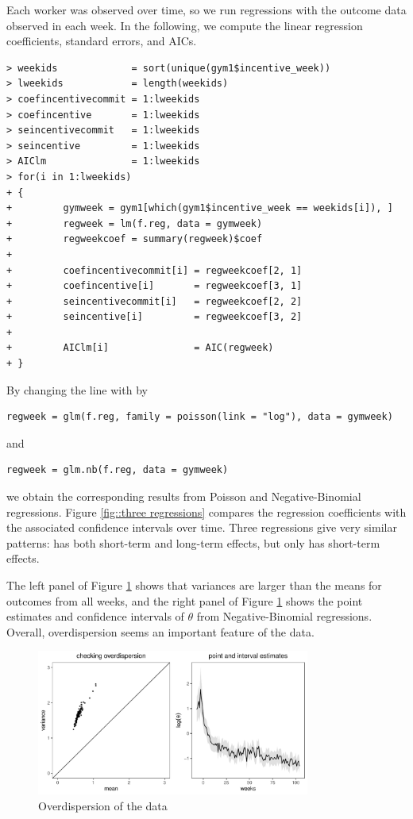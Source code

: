 Each worker was observed over time, so we run regressions with the outcome data observed in each week. In the following, we compute the linear regression coefficients, standard errors, and AICs. 

\begin{lstlisting}
> weekids             = sort(unique(gym1$incentive_week))
> lweekids            = length(weekids)
> coefincentivecommit = 1:lweekids
> coefincentive       = 1:lweekids
> seincentivecommit   = 1:lweekids
> seincentive         = 1:lweekids
> AIClm               = 1:lweekids
> for(i in 1:lweekids)
+ {
+         gymweek = gym1[which(gym1$incentive_week == weekids[i]), ]   
+         regweek = lm(f.reg, data = gymweek)
+         regweekcoef = summary(regweek)$coef
+         
+         coefincentivecommit[i] = regweekcoef[2, 1]
+         coefincentive[i]       = regweekcoef[3, 1]
+         seincentivecommit[i]   = regweekcoef[2, 2]
+         seincentive[i]         = regweekcoef[3, 2]
+         
+         AIClm[i]               = AIC(regweek)
+ }
\end{lstlisting}


By changing the line with  by 
\begin{lstlisting}
regweek = glm(f.reg, family = poisson(link = "log"), data = gymweek)
\end{lstlisting}
and 
\begin{lstlisting}
regweek = glm.nb(f.reg, data = gymweek)
\end{lstlisting}
we obtain the corresponding results from Poisson and Negative-Binomial regressions. Figure \ref{fig::three regressions} compares the regression coefficients with the associated confidence intervals over time. Three regressions give very similar patterns:  has both short-term and long-term effects, but  only has short-term effects.  



The left panel of Figure \ref{fig::overdispersion-gym} shows that variances are larger than the means for outcomes from all weeks, and the right panel of Figure \ref{fig::overdispersion-gym} shows the point estimates and confidence intervals of $\theta$ from Negative-Binomial regressions. Overall, overdispersion seems an important feature of the data. 


\begin{figure}
\centering
\includegraphics[width = 0.8\textwidth]{figures/gym_overdispersion_check.pdf}
\caption{Overdispersion of the data}\label{fig::overdispersion-gym}
\end{figure}



